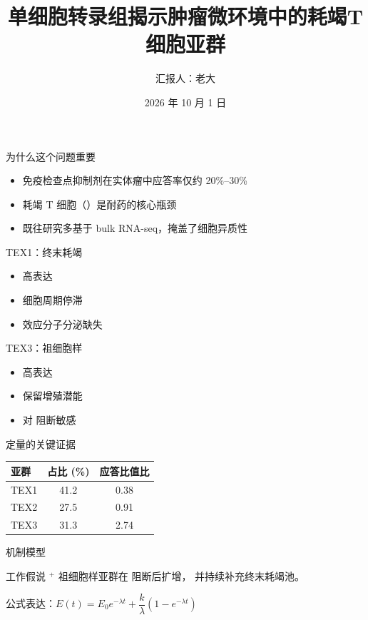 \documentclass[aspectratio=169,10pt,t]{beamer}
\title{单细胞转录组揭示肿瘤微环境中的耗竭T细胞亚群}
\author{汇报人：老大}
\institute{某某大学生命科学学院}
\date{2026 年 10 月 1 日}
\begin{document}
\naturetitlepage


\begin{frame}{为什么这个问题重要}
  \begin{itemize}
    \item 免疫检查点抑制剂在实体瘤中应答率仅约 \alert{20\%--30\%}
    \item 耗竭 T 细胞（）是耐药的核心瓶颈
    \item 既往研究多基于 bulk RNA-seq，掩盖了细胞异质性
  \end{itemize}
  \vspace{1mm}
\end{frame}


  {TEX1：终末耗竭}
  {\begin{itemize}
     \item {} 高表达
     \item 细胞周期停滞
     \item 效应分子分泌缺失
   \end{itemize}}
  {TEX3：祖细胞样}
  {\begin{itemize}
     \item {} 高表达
     \item 保留增殖潜能
     \item 对  阻断敏感
   \end{itemize}}

\begin{frame}{定量的关键证据}
  \centering
  \begin{tabular}{lcc}
    \toprule
    亚群 & 占比 (\%) & 应答比值比 \\
    \midrule
    TEX1 & 41.2 & 0.38 \\
    TEX2 & 27.5 & 0.91 \\
    TEX3 & 31.3 & \alert{2.74} \\
    \bottomrule
  \end{tabular}
\end{frame}

\begin{frame}{机制模型}
  \begin{block}{工作假说}
    $^{+}$ 祖细胞样亚群在  阻断后扩增，
    并持续补充终末耗竭池。
  \end{block}
  \vspace{1mm}
  公式表达：$E(t) = E_0 e^{-\lambda t} + \dfrac{k}{\lambda}\left(1 - e^{-\lambda t}\right)$
\end{frame}

\end{document}

